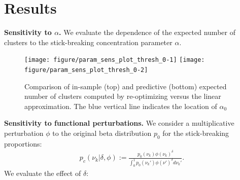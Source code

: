 \documentclass[a0,plainsections,30pt]{sciposter}\usepackage[]{graphicx}\usepackage[]{color}
\newenvironment{knitrout}{}{} %
\newcommand{\Expect}{\mathbb{E}}
\newcommand{\etazopt}{\eta_z^{*}}
\newcommand{\etathetaopt}{\eta_\theta^{*}}
\newcommand{\QExpect}
{\Expect_{q\left(\theta, z \vert \eta_\theta, \etazopt(\eta_\theta)\right)}}
\begin{document}
\begin{minipage}[t]{0.45\textwidth}




\section*{Results}
\vspace{-0.3in}
{\bf \large Sensitivity to $\alpha$.}
We evaluate the dependence of the expected number of clusters to the stick-breaking concentration parameter $\alpha$. 
%




\begin{figure}
\centering
\begin{knitrout}
\color{fgcolor}

{\centering \texttt{[image: figure/param\_sens\_plot\_thresh\_0-1]} 
\texttt{[image: figure/param\_sens\_plot\_thresh\_0-2]} 

}



\end{knitrout}
\caption{Comparison of in-sample (top) and predictive (bottom) expected number of clusters computed by re-optimizing versus the linear approximation. 
The blue vertical line indicates the location of $\alpha_0$}
\end{figure}

{\bf \large Sensitivity to functional perturbations. }
We consider a multiplicative perturbation $\phi$ to
the original beta distribution $p_0$ for the stick-breaking proportions:
\vspace{-0.2in}
\begin{align}
\label{eq:expon_perturb}
	p_c(\nu_k \vert \delta, \phi) :=
  \frac{p_{0}(\nu_k)\phi(\nu_k)^\delta}
       {\int_0^1 p_0(\nu_k')\phi(\nu')^\delta d\nu_k'}.
\end{align}
We evaluate the effect of $\delta$:
\begin{figure}
\centering


\end{figure}
\end{minipage}
\end{document}
